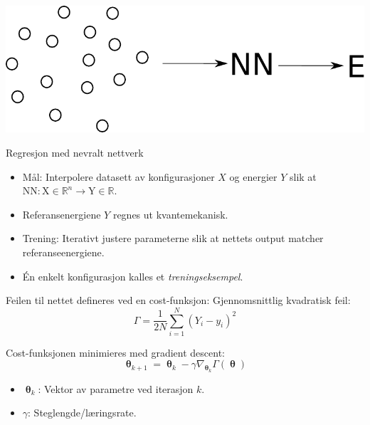\documentclass{beamer}
\begin{document}
\begin{frame}
 
\centering
\includegraphics[width=0.8\linewidth]{../Figures/Presentation/interpolation.pdf}
\begin{block}{Regresjon med nevralt nettverk}
 \begin{itemize}
  \item Mål: Interpolere datasett av konfigurasjoner $X$ og energier $Y$ slik at
        $\mathrm{NN}: \mathrm{X} \in \mathbb{R}^n \rightarrow \mathrm{Y} \in \mathbb{R}$.
  \item Referansenergiene $Y$ regnes ut kvantemekanisk. 
  \item Trening: Iterativt justere parameterne slik at nettets output matcher referanseenergiene.
  \item Én enkelt konfigurasjon kalles et \textit{treningseksempel}. 
 \end{itemize}
\end{block}

\end{frame}


\begin{frame}
 
\begin{block}{Feilen til nettet defineres ved en cost-funksjon:} 
 Gjennomsnittlig kvadratisk feil:
 \begin{equation*}
 \Gamma = \frac{1}{2N}\sum_{i=1}^N (Y_i - y_i)^2
 \end{equation*}
\end{block}

\begin{block}{Cost-funksjonen minimieres med gradient descent:}
 \begin{equation*}
  \boldsymbol{\uptheta}_{k+1} = \boldsymbol{\uptheta}_{k} - \gamma \nabla_{\boldsymbol{\uptheta}_k} \Gamma(\boldsymbol{\uptheta})
 \end{equation*}
 \begin{itemize}
  \item $\boldsymbol{\uptheta}_{k}$: Vektor av parametre ved iterasjon $k$. 
  \item $\gamma$: Steglengde/læringsrate. 
 \end{itemize}
\end{block}

\end{frame}
\end{document}

